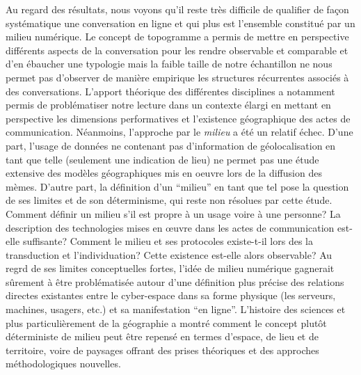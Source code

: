 Au regard des résultats, nous voyons qu{\textquoteright}il reste très difficile de qualifier de fa\c{c}on systématique une conversation en ligne et qui plus est l{\textquoteright}ensemble constitué par un milieu numérique. Le concept de topogramme a permis de mettre en perspective différents aspects de la conversation pour les rendre observable et comparable et d{\textquoteright}en ébaucher une typologie mais la faible taille de notre échantillon ne nous permet pas d{\textquoteright}observer de manière empirique les structures récurrentes associés à des conversations. L{\textquoteright}apport théorique des différentes disciplines a notamment permis de problématiser notre lecture dans un contexte élargi en mettant en perspective les dimensions performatives et l{\textquoteright}existence géographique des actes de communication. Néanmoins, l{\textquoteright}approche par le \textit{milieu} a été un relatif échec. D{\textquoteright}une part, l{\textquoteright}usage de données ne contenant pas d{\textquoteright}information de géolocalisation en tant que telle (seulement une indication de lieu) ne permet pas une étude extensive des modèles géographiques mis en oeuvre lors de la diffusion des mèmes. D{\textquoteright}autre part, la définition d{\textquoteright}un {\textquotedblleft}milieu{\textquotedblright} en tant que tel pose la question de ses limites et de son déterminisme, qui reste non résolues par cette étude. Comment définir un milieu s{\textquoteright}il est propre à un usage voire à une personne? La description des technologies mises en {\oe}uvre dans les actes de communication est-elle suffisante? Comment le milieu et ses protocoles existe-t-il lors des la transduction et l{\textquoteright}individuation? Cette existence est-elle alors observable? Au regrd de ses limites conceptuelles fortes, l{\textquoteright}idée de milieu numérique gagnerait s\^urement à être problématisée autour d{\textquoteright}une définition plus précise des relations directes existantes entre le cyber-espace dans sa forme physique (les serveurs, machines, usagers, etc.) et sa manifestation {\textquotedblleft}en ligne{\textquotedblright}. L{\textquoteright}histoire des sciences et plus particulièrement de la géographie a montré comment le concept plut\^ot déterministe de milieu peut être repensé en termes d{\textquoteright}espace, de lieu et de territoire, voire de paysages offrant des prises théoriques et des approches méthodologiques nouvelles.

